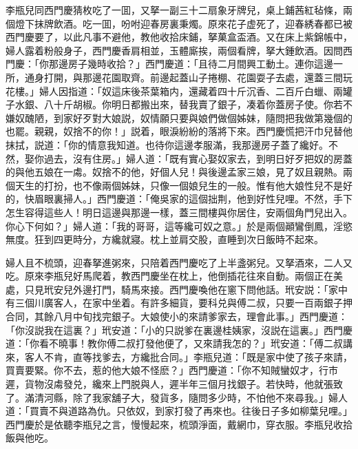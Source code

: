 李瓶兒同西門慶猜枚吃了一囬，又拏一副三十二扇象牙牌兒，桌上鋪茜紅毡條，兩個燈下抹牌飲酒。吃一囬，吩咐迎春房裏秉燭。原來花子虚死了，迎春綉春都已被西門慶要了，以此凡事不避他，教他收拾床鋪，拏菓盒盃酒。又在床上紫錦帳中，婦人露着粉般身子，西門慶香肩相並，玉體廝挨，兩個看牌，拏大鍾飲酒。因問西門慶：「你那邊房子幾時收拾？」西門慶道：「且待二月間興工動土。連你這邊一所，通身打開，與那邊花園取齊。前邊起蓋山子捲棚、花園耍子去處，還蓋三間玩花樓。」婦人因指道：「奴這床後茶葉箱内，還藏着四十斤沉香、二百斤白蠟、兩罐子水銀、八十斤胡椒。你明日都搬出來，替我賣了銀子，凑着你蓋房子使。你若不嫌奴醜陋，到家好歹對大娘説，奴情願只要與娘們做個姊妹，隨問把我做第幾個的也罷。親親，奴捨不的你！」説着，眼淚紛紛的落將下來。西門慶慌把汗巾兒替他抹拭，説道：「你的情意我知道。也待你這邊孝服滿，我那邊房子蓋了纔好。不然，娶你過去，沒有住房。」婦人道：「既有實心娶奴家去，到明日好歹把奴的房蓋的與他五娘在一䖏。奴捨不的他，好個人兒！與後邊孟家三娘，見了奴且親熱。兩個天生的打扮，也不像兩個姊妹，只像一個娘兒生的一般。惟有他大娘性兒不是好的，快眉眼裏掃人。」西門慶道：「俺吳家的這個拙荆，他到好性兒哩。不然，手下怎生容得這些人！明日這邊與那邊一樣，蓋三間樓與你居住，安兩個角門兒出入。你心下何如？」婦人道：「我的哥哥，這等纔可奴之意。」於是兩個顚鸞倒鳳，淫慾無度。狂到四更時分，方纔就寢。枕上並肩交股，直睡到次日飯時不起來。

婦人且不梳頭，迎春拏進粥來，只陪着西門慶吃了上半盞粥兒。又拏酒來，二人又吃。原來李瓶兒好馬爬着，教西門慶坐在枕上，他倒插花往來自動。兩個正在美處，只見玳安兒外邊打門，騎馬來接。西門慶喚他在窻下問他話。玳安説：「家中有三個川廣客人，在家中坐着。有許多細貨，要科兑與傅二叔，只要一百兩銀子押合同，其餘八月中旬找完銀子。大娘使小的來請爹家去，理會此事。」西門慶道：「你沒説我在這裏？」玳安道：「小的只説爹在裏邊桂姨家，沒説在這裏。」西門慶道：「你看不曉事！教你傅二叔打發他便了，又來請我怎的？」玳安道：「傅二叔講來，客人不肯，直等找爹去，方纔批合同。」李瓶兒道：「既是家中使了孩子來請，買賣要緊。你不去，惹的他大娘不怪麽？」西門慶道：「你不知賊蠻奴才，行巿遲，貨物沒䖏發兑，纔來上門脱與人，遲半年三個月找銀子。若快時，他就張致了。滿清河縣，除了我家舖子大，發貨多，隨問多少時，不怕他不來尋我。」婦人道：「買賣不與道路為仇。只依奴，到家打發了再來也。往後日子多如柳葉兒哩。」西門慶於是依聽李瓶兒之言，慢慢起來，梳頭淨面，戴網巾，穿衣服。李瓶兒收拾飯與他吃。

